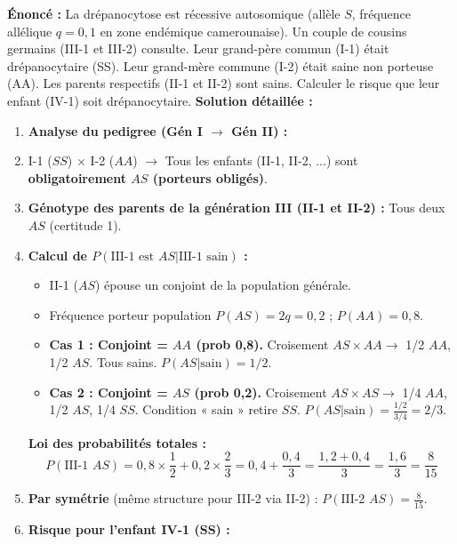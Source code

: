\documentclass[11pt]{article}
\begin{document}
\begin{exoresolu}
    \textbf{Énoncé :} La drépanocytose est récessive autosomique (allèle $S$, fréquence allélique $q = 0,1$ en zone endémique camerounaise). Un couple de cousins germains (III-1 et III-2) consulte. Leur grand-père commun (I-1) était drépanocytaire (SS). Leur grand-mère commune (I-2) était saine non porteuse (AA). Les parents respectifs (II-1 et II-2) sont sains. Calculer le risque que leur enfant (IV-1) soit drépanocytaire.
    \tcblower
    \textbf{Solution détaillée :}
    \begin{enumerate}
        \item \textbf{Analyse du pedigree (Gén I $\rightarrow$ Gén II) :}
              \item I-1 ($SS$) $\times$ I-2 ($AA$) $\rightarrow$ Tous les enfants (II-1, II-2, ...) sont \textbf{obligatoirement $AS$ (porteurs obligés)}.
        \item \textbf{Génotype des parents de la génération III (II-1 et II-2) :} Tous deux $AS$ (certitude 1).
        \item \textbf{Calcul de $P(\text{III-1 est } AS | \text{III-1 sain})$ :}
              \begin{itemize}
                  \item II-1 ($AS$) épouse un conjoint de la population générale.
                  \item Fréquence porteur population $P(AS) = 2q = 0,2$ ; $P(AA) = 0,8$.
                  \item \textbf{Cas 1 : Conjoint = $AA$ (prob 0,8).} Croisement $AS \times AA \rightarrow$ 1/2 $AA$, 1/2 $AS$. Tous sains. $P(AS | \text{sain}) = 1/2$.
                  \item \textbf{Cas 2 : Conjoint = $AS$ (prob 0,2).} Croisement $AS \times AS \rightarrow$ 1/4 $AA$, 1/2 $AS$, 1/4 $SS$. Condition « sain » retire $SS$. $P(AS | \text{sain}) = \frac{1/2}{3/4} = 2/3$.
              \end{itemize}
              \textbf{Loi des probabilités totales :}
              \[
              P(\text{III-1 } AS) = 0,8 \times \frac{1}{2} + 0,2 \times \frac{2}{3} = 0,4 + \frac{0,4}{3} = \frac{1,2 + 0,4}{3} = \frac{1,6}{3} = \frac{8}{15}
              \]
        \item \textbf{Par symétrie} (même structure pour III-2 via II-2) : $P(\text{III-2 } AS) = \frac{8}{15}$.
        \item \textbf{Risque pour l'enfant IV-1 (SS) :}

\end{enumerate}
\end{exoresolu}
\end{document}
